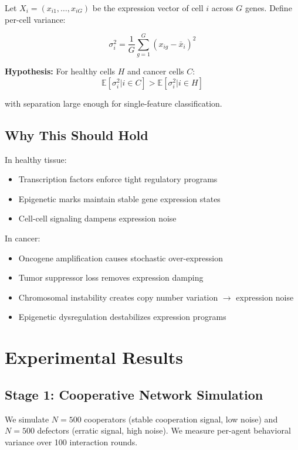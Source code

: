\documentclass[12pt, letterpaper]{article}
\begin{document}
Let $X_i = (x_{i1}, \ldots, x_{iG})$ be the expression vector of cell $i$ across $G$ genes. Define per-cell variance:

\begin{equation}
\sigma_i^2 = \frac{1}{G} \sum_{g=1}^{G} (x_{ig} - \bar{x}_i)^2
\end{equation}

\textbf{Hypothesis:} For healthy cells $H$ and cancer cells $C$:
\begin{equation}
\mathbb{E}[\sigma_i^2 | i \in C] > \mathbb{E}[\sigma_i^2 | i \in H]
\end{equation}

with separation large enough for single-feature classification.

\subsection{Why This Should Hold}

In healthy tissue:
\begin{itemize}
    \item Transcription factors enforce tight regulatory programs
    \item Epigenetic marks maintain stable gene expression states
    \item Cell-cell signaling dampens expression noise
\end{itemize}

In cancer:
\begin{itemize}
    \item Oncogene amplification causes stochastic over-expression
    \item Tumor suppressor loss removes expression damping
    \item Chromosomal instability creates copy number variation $\rightarrow$ expression noise
    \item Epigenetic dysregulation destabilizes expression programs
\end{itemize}

\section{Experimental Results}

\subsection{Stage 1: Cooperative Network Simulation}

We simulate $N = 500$ cooperators (stable cooperation signal, low noise) and $N = 500$ defectors (erratic signal, high noise). We measure per-agent behavioral variance over 100 interaction rounds.
\end{document}
